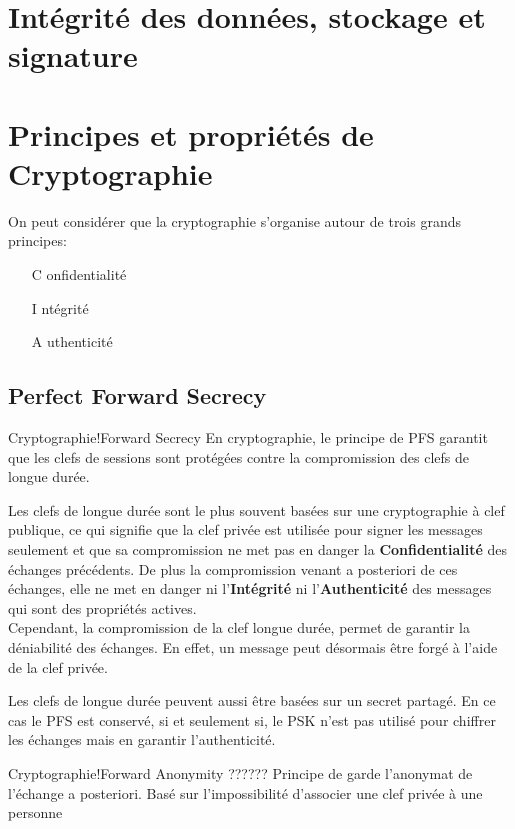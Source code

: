 \section{Intégrité des données, stockage et signature}

\section{Principes et propriétés de Cryptographie}
\begin{Pre}
On peut considérer que la cryptographie s'organise autour de trois grands principes:\begin{itemize}
\item[C]onfidentialité
\item[I]ntégrité
\item[A]uthenticité
\end{itemize}
\end{Pre}
\subsection{Perfect Forward Secrecy}
\begin{Define}{Cryptographie!Forward Secrecy}
En cryptographie, le principe de \gls{PFS} garantit que les clefs de sessions sont protégées contre la compromission des clefs de longue durée.
\end{Define}
Les clefs de longue durée sont le plus souvent basées sur une cryptographie à clef publique, ce qui signifie que la clef privée est utilisée pour signer les messages seulement et que sa compromission ne met pas en danger la \textbf{Confidentialité} des échanges précédents. De plus la compromission venant a posteriori de ces échanges, elle ne met en danger ni l'\textbf{Intégrité} ni l'\textbf{Authenticité} des messages qui sont des propriétés actives.\\
Cependant, la compromission de la clef longue durée, permet de garantir la déniabilité des échanges. En effet, un message peut désormais être forgé à l'aide de la clef privée.
\begin{Warning}
Les clefs de longue durée peuvent aussi être basées sur un secret partagé. En ce cas le \gls{PFS} est conservé, si et seulement si, le \gls{PSK} n'est pas utilisé pour chiffrer les échanges mais en garantir l'authenticité.
\end{Warning}
\begin{Define}{Cryptographie!Forward Anonymity}
?????? Principe de garde l'anonymat de l'échange a posteriori. Basé sur l'impossibilité d'associer une clef privée à une personne
\end{Define}

